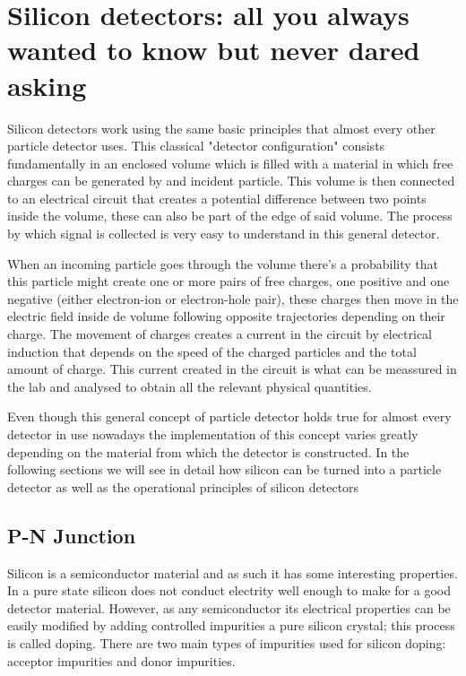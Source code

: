 \chapter{Silicon detectors: all you always wanted to know but never dared asking} %
\label{cha:simulator_development}

Silicon detectors work using the same basic principles that almost every other particle detector uses. This classical "detector configuration" consists fundamentally in an enclosed volume which is filled with a material in which free charges can be generated by and incident particle. This volume is then connected to an electrical circuit that creates a  potential difference between two points inside the volume, these can also be part of the edge of said volume. The process by which signal is collected is very easy to understand in this general detector.

When an incoming particle goes through the volume there's a probability that this particle might create one or more pairs of free charges, one positive and one negative (either electron-ion or electron-hole pair), these charges then move in the electric field inside de volume following opposite trajectories depending on their charge. The movement of charges creates a current in the circuit by electrical induction that depends on the speed of the charged particles and the total amount of charge. This current created in the circuit is what can be meassured in the lab and analysed to obtain all the relevant physical quantities.

Even though this general concept of particle detector holds true for almost every detector in use nowadays the implementation of this concept varies greatly depending on the material from which the detector is constructed. In the following sections we will see in detail how silicon can be turned into a particle detector as well as the operational principles of silicon detectors

\section{P-N Junction}

Silicon is a semiconductor material and as such it has some interesting properties. In a pure state silicon does not conduct electrity well enough to make for a good detector material. However, as any semiconductor its electrical properties can be easily modified by adding controlled impurities a pure silicon crystal; this process is called doping. There are two main types of impurities used for silicon doping: acceptor impurities and donor impurities.

